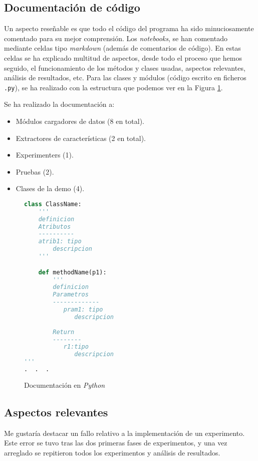 \subsection{Documentación de código}\label{sec:docupython}
Un aspecto reseñable es que todo el código del programa ha sido minuciosamente comentado para su mejor comprensión. Los \textit{notebooks}, se han comentado mediante celdas tipo \textit{markdown} (además de comentarios de código). En estas celdas se ha explicado multitud de aspectos, desde todo el proceso que hemos seguido, el funcionamiento de los métodos y clases usadas, aspectos relevantes, análisis de resultados, etc. Para las clases y módulos (código escrito en ficheros \texttt{.py}), se ha realizado con la estructura que podemos ver en la Figura \ref{code:docpython}.

Se ha realizado la documentación a:
\begin{itemize}
\item Módulos cargadores de datos (8 en total).
\item Extractores de características (2 en total).
\item Experimenters (1).
\item Pruebas (2).
\item Clases de la demo (4).
\end{itemize}

\begin{figure}
	\centering
	\begin{lstlisting}[language=Python]
class ClassName:
    ''' 
    definicion
    Atributos
    ----------
    atrib1: tipo
        descripcion
    '''

    def methodName(p1):
        '''
        definicion
        Parametros
        -------------
		   pram1: tipo
		      descripcion
        
        Return
        --------
		   r1:tipo
		      descripcion
'''   
.  .  .
	\end{lstlisting}
	\caption{Documentación en \textit{Python}}
	\label{code:docpython}
\end{figure}



\subsection{Aspectos relevantes}
Me gustaría destacar un fallo relativo a la implementación de un experimento. Este error se tuvo tras las dos primeras fases de experimentos, y una vez arreglado se repitieron todos los experimentos y análisis de resultados.

